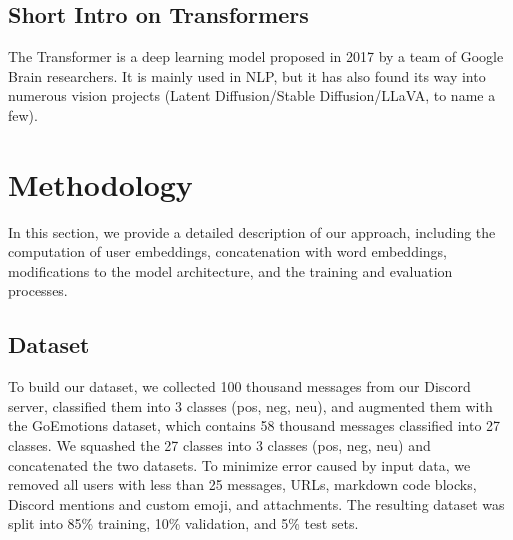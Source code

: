 \documentclass{article}
\begin{document}
\subsection{Short Intro on Transformers}
The Transformer\cite{vaswani2017attention} is a deep learning model proposed in 2017 by a team of Google Brain researchers. It is mainly used in NLP, but it has also found its way into numerous vision projects (Latent Diffusion\cite{rombach2021highresolution}/Stable Diffusion/LLaVA\cite{liu2023visual}, to name a few).

\section{Methodology}
In this section, we provide a detailed description of our approach, including the computation of user embeddings, concatenation with word embeddings, modifications to the model architecture, and the training and evaluation processes.


\subsection{Dataset}
To build our dataset, we collected 100 thousand messages from our Discord server, classified them into 3 classes (pos, neg, neu), and augmented them with the GoEmotions\cite{demszky2020goemotions} dataset, which contains 58 thousand messages classified into 27 classes. We squashed the 27 classes into 3 classes (pos, neg, neu) and concatenated the two datasets. To minimize error caused by input data, we removed all users with less than 25 messages, URLs, markdown code blocks, Discord mentions and custom emoji, and attachments. The resulting dataset was split into 85\% training, 10\% validation, and 5\% test sets.
\end{document}
